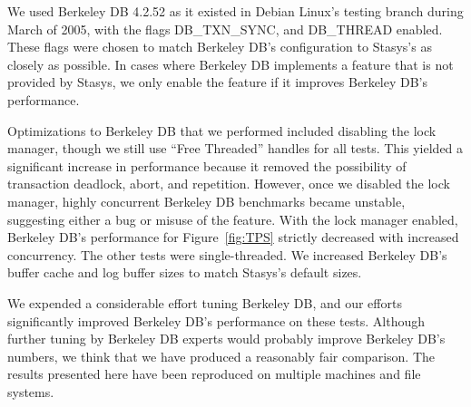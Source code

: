 \documentclass[letterpaper,twocolumn,10pt]{article}
\newcommand{\yad}{Stasys\xspace}
\begin{document}
We used Berkeley DB 4.2.52 as it existed in Debian Linux's testing
branch during March of 2005, with the flags DB\_TXN\_SYNC, and
DB\_THREAD enabled. These flags were chosen to match Berkeley DB's
configuration to \yad's as closely as possible.  In cases where
Berkeley DB implements a feature that is not provided by \yad, we
only enable the feature if it improves Berkeley DB's performance.

Optimizations to Berkeley DB that we performed included disabling the
lock manager, though we still use ``Free Threaded'' handles for all
tests.  This yielded a significant increase in performance because it
removed the possibility of transaction deadlock, abort, and
repetition.  However, once we disabled the lock manager, highly
concurrent Berkeley DB benchmarks became unstable, suggesting either a
bug or misuse of the feature.  With the lock manager enabled, Berkeley
DB's performance for Figure~\ref{fig:TPS} strictly decreased with
increased concurrency.  The other tests were single-threaded.  We
increased Berkeley DB's buffer cache and log buffer sizes to match
\yad's default sizes.

We expended a considerable effort tuning Berkeley DB, and our efforts
significantly improved Berkeley DB's performance on these tests.
Although further tuning by Berkeley DB experts would probably improve
Berkeley DB's numbers, we think that we have produced a reasonably
fair comparison.  The results presented here have been reproduced on
multiple machines and file systems.
\end{document}
